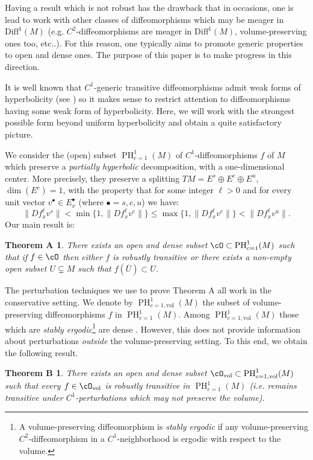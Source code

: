 \documentclass[a4paper,11pt]{amsart}
\numberwithin{equation}{section}     %
\newtheorem*{teoA}{Theorem A}
\newtheorem*{teoB}{Theorem B}
\theoremstyle{definition}
\theoremstyle{remark}
\DeclareMathOperator{\PH}{PH}
\begin{document}
Having a result which is not robust has the drawback that in occasions, one is lead to work with other classes of diffeomorphisms which may be meager in $\mathrm{Diff}^1(M)$ (e.g. $C^2$-diffeomorphisms are meager in $\mathrm{Diff}^1(M)$, volume-preserving ones too, etc..). For this reason, one typically aims to promote generic properties to open and dense ones. The purpose of this paper is to make progress in this direction. 

It is well known that $C^1$-generic transitive diffeomorphisms admit weak forms of hyperbolicity (see \cite{BDP}) so it makes sense to restrict attention to diffeomorphisms having some weak form of hyperbolicity. Here, we will work with the strongest possible form beyond uniform hyperbolicity and obtain a quite satisfactory picture. 

We consider the (open) subset $\PH^1_{c=1}(M)$ of $C^1$-diffeomorphisms $f$ of $M$
which preserve a \emph{partially hyperbolic} decomposition, with a one-dimensional center.
More precisely, they preserve a splitting $T M = E^s \oplus E^c \oplus E^u$, $\dim(E^c)=1$, with the property that for some integer $\ell >0$ and for every unit vector  $v^\bullet \in E^\bullet_x$ (where $\bullet=s,c,u$) we have:
\begin{equation*}
\|Df_x^\ell v^s \| < \min \{1, \|Df_x^\ell v^c \|\} \leq \max \{ 1, \|Df_x^\ell v^c \| \} < \|Df_x^\ell v^u \|.
\end{equation*}
Our main result is:

\begin{teoA}
There exists an open and dense subset $\cO\subset \PH^1_{c=1}(M)$ such that if $f \in \cO$ then either $f$ is robustly transitive or there exists a non-empty open subset $U\subsetneq M$ such that $f(\overline U) \subset U$. 
\end{teoA}

The perturbation techniques we use to prove Theorem A all work in the conservative setting. We denote by $\PH^1_{c=1,\mathrm{vol}}(M)$ the subset of volume-preserving diffeomorphisms $f$ in $\PH^1_{c=1}(M)$. Among $\PH^1_{c=1,\mathrm{vol}}(M)$ those which are \emph{stably ergodic}\footnote{A volume-preserving diffeomorphism is \emph{stably ergodic} if any volume-preserving $C^2$-diffeomorphism in a $C^{1}$-neighborhood is ergodic with respect to the volume.} are dense \cite{BMVW}. However, this does not provide information about perturbations \emph{outside} the volume-preserving setting. To this end, we obtain the following result.

\begin{teoB}
There exists an open and dense subset $\cO_{\mathrm{vol}}\subset \PH^1_{c=1,\mathrm{vol}}(M)$ such that every $f \in \cO_{\mathrm{vol}}$ is robustly transitive in $\PH^1_{c=1}(M)$ (i.e. remains transitive under $C^1$-perturbations which may not preserve the volume). 
\end{teoB}
\end{document}
